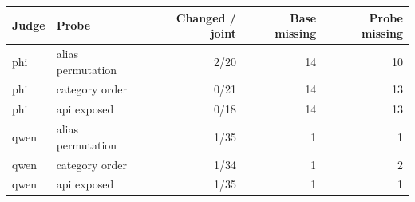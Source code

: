 \begin{tabular}{llrrr}
\toprule
Judge & Probe & Changed / joint & Base missing & Probe missing \\
\midrule
phi & alias permutation & 2/20 & 14 & 10 \\
phi & category order & 0/21 & 14 & 13 \\
phi & api exposed & 0/18 & 14 & 13 \\
qwen & alias permutation & 1/35 & 1 & 1 \\
qwen & category order & 1/34 & 1 & 2 \\
qwen & api exposed & 1/35 & 1 & 1 \\
\bottomrule
\end{tabular}